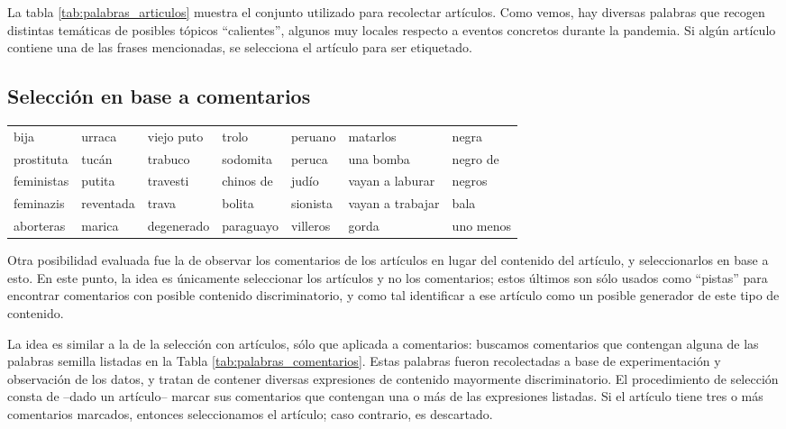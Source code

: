 La tabla \ref{tab:palabras_articulos} muestra el conjunto utilizado para recolectar artículos. Como vemos, hay diversas palabras que recogen distintas temáticas de posibles tópicos ``calientes'', algunos muy locales respecto a eventos concretos durante la pandemia. Si algún artículo contiene una de las frases mencionadas, se selecciona el artículo para ser etiquetado.


\subsection{Selección en base a comentarios}
\label{subsec:seleccion_comentarios}


\begin{table*}[t!]
    \centering
    \small
    \begin{tabular}{l l l l l l l}
    \hline
    bija          & urraca     & viejo puto    & trolo      & peruano  & matarlos         & negra      \\
    prostituta    & tucán      & trabuco       & sodomita   & peruca   & una bomba        & negro de   \\
    feministas    & putita     & travesti      & chinos de  & judío    & vayan a laburar  & negros     \\
    feminazis     & reventada  & trava         & bolita     & sionista & vayan a trabajar & bala       \\
    aborteras     & marica     & degenerado    & paraguayo  & villeros & gorda            & uno menos  \\
    \hline
    \end{tabular}
    \caption{Palabras utilizadas para recolectar comentarios}
    \label{tab:palabras_comentarios}
\end{table*}

Otra posibilidad evaluada fue la de observar los comentarios de los artículos en lugar del contenido del artículo, y seleccionarlos en base a esto. En este punto, la idea es únicamente seleccionar los artículos y no los comentarios; estos últimos son sólo usados como ``pistas'' para encontrar comentarios con posible contenido discriminatorio, y como tal identificar a ese artículo como un posible generador de este tipo de contenido.

La idea es similar a la de la selección con artículos, sólo que aplicada a comentarios: buscamos comentarios que contengan alguna de las palabras semilla listadas en la Tabla \ref{tab:palabras_comentarios}. Estas palabras fueron recolectadas a base de experimentación y observación de los datos, y tratan de contener diversas expresiones de contenido mayormente discriminatorio. El procedimiento de selección consta de --dado un artículo-- marcar sus comentarios que contengan una o más de las expresiones listadas. Si el artículo tiene tres o más comentarios marcados, entonces seleccionamos el artículo; caso contrario, es descartado.

